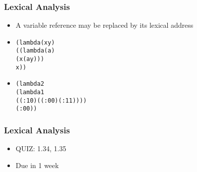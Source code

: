 \documentclass{beamer}
\begin{document}
\begin{frame}[fragile]
\frametitle{Lexical Analysis}
\begin{scriptsize}
\begin{itemize}
\item<1-> A variable reference may be replaced by its lexical address

\item<2->
\begin{alltt}
(lambda (x y)		
  ((lambda (a)	
	(x (a y)))
   x))
\end{alltt}

\item<3->
\begin{alltt}
(lambda 2		
  (lambda 1
    ((: 1 0) ((: 0 0) (: 1 1))))
  (: 0 0))

\end{alltt}

\end{itemize}
\end{scriptsize}
\end{frame}

\begin{frame}[fragile]
\frametitle{Lexical Analysis}
\begin{scriptsize}
\begin{itemize}
\item<1-> QUIZ: 1.34, 1.35

\item<2-> Due in 1 week

\end{itemize}
\end{scriptsize}
\end{frame}
\end{document}

